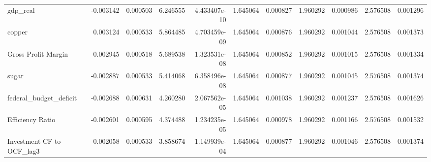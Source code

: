 \documentclass[12pt,a4paper,english]{article}
\begin{document}
{{\begin{tabular}{@{}lrrrrrrrrrr@{}}
			gdp\_real                      & -0.003142                & 0.000503                    & 6.246555                  & 4.433407e-10                             & 1.645064                      & 0.000827                      & 1.960292                     & 0.000986                     & 2.576508                     & 0.001296                     \\
			copper                         & 0.003124                 & 0.000533                    & 5.864485                  & 4.703459e-09                             & 1.645064                      & 0.000876                      & 1.960292                     & 0.001044                     & 2.576508                     & 0.001373                     \\
			Gross Profit Margin            & 0.002945                 & 0.000518                    & 5.689538                  & 1.323531e-08                             & 1.645064                      & 0.000852                      & 1.960292                     & 0.001015                     & 2.576508                     & 0.001334                     \\
			sugar                          & -0.002887                & 0.000533                    & 5.414068                  & 6.358496e-08                             & 1.645064                      & 0.000877                      & 1.960292                     & 0.001045                     & 2.576508                     & 0.001374                     \\
			federal\_budget\_deficit       & -0.002688                & 0.000631                    & 4.260280                  & 2.067562e-05                             & 1.645064                      & 0.001038                      & 1.960292                     & 0.001237                     & 2.576508                     & 0.001626                     \\
			Efficiency Ratio               & -0.002601                & 0.000595                    & 4.374488                  & 1.234235e-05                             & 1.645064                      & 0.000978                      & 1.960292                     & 0.001166                     & 2.576508                     & 0.001532                     \\
			Investment CF to OCF\_lag3     & 0.002058                 & 0.000533                    & 3.858674                  & 1.149939e-04                             & 1.645064                      & 0.000877                      & 1.960292                     & 0.001046                     & 2.576508                     & 0.001374                     \\

\end{tabular}}}
\end{document}
